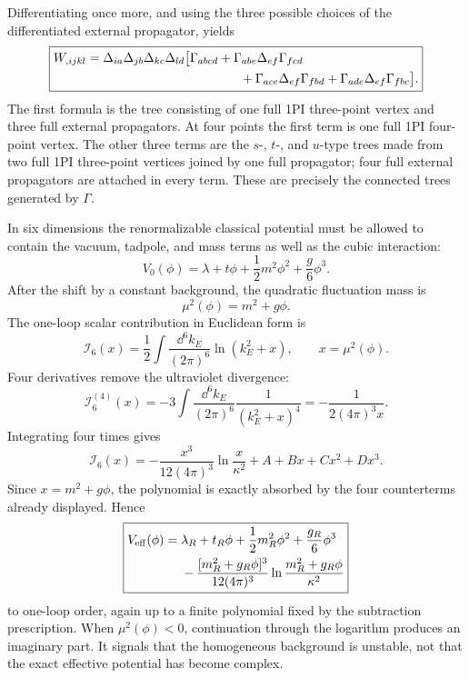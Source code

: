 \begin{enumerate}
  Differentiating once more, and using the three possible choices of the
  differentiated external propagator, yields
  \[
    \boxed{\begin{aligned}
    W_{,ijkl}
      ={}&\Delta_{ia}\Delta_{jb}\Delta_{kc}\Delta_{ld}
      \bigl[
        \Gamma_{abcd}
        +\Gamma_{abe}\Delta_{ef}\Gamma_{fcd}\\
        &\hspace{38mm}
        +\Gamma_{ace}\Delta_{ef}\Gamma_{fbd}
        +\Gamma_{ade}\Delta_{ef}\Gamma_{fbc}
      \bigr].
    \end{aligned}}
  \]
  The first formula is the tree consisting of one full 1PI three-point
  vertex and three full external propagators.  At four points the first
  term is one full 1PI four-point vertex.  The other three terms are the
  \(s\)-, \(t\)-, and \(u\)-type trees made from two full 1PI
  three-point vertices joined by one full propagator; four full external
  propagators are attached in every term.  These are precisely the
  connected trees generated by \(\Gamma\).

  In six dimensions the renormalizable classical potential must be
  allowed to contain the vacuum, tadpole, and mass terms as well as the
  cubic interaction:
  \[
    V_0(\phi)=\lambda+t\phi+\frac12m^2\phi^2+\frac{g}{6}\phi^3 .
  \]
  After the shift by a constant background, the quadratic fluctuation
  mass is
  \[
    \mu^2(\phi)=m^2+g\phi .
  \]
  The one-loop scalar contribution in Euclidean form is
  \[
    \mathcal I_6(x)
      =\frac12\int\frac{\dd^6k_E}{(2\pi)^6}\ln(k_E^2+x),
      \qquad x=\mu^2(\phi).
  \]
  Four derivatives remove the ultraviolet divergence:
  \[
    \mathcal I_6^{(4)}(x)
      =-3\int\frac{\dd^6k_E}{(2\pi)^6}
        \frac1{(k_E^2+x)^4}
      =-\frac{1}{2(4\pi)^3x}.
  \]
  Integrating four times gives
  \[
    \mathcal I_6(x)
      =-\frac{x^3}{12(4\pi)^3}\ln\frac{x}{\kappa^2}
        +A+Bx+Cx^2+Dx^3.
  \]
  Since \(x=m^2+g\phi\), the polynomial is exactly absorbed by the four
  counterterms already displayed.  Hence
  \[
    \boxed{\begin{aligned}
    V_{\rm eff}(\phi)={}&
      \lambda_R+t_R\phi+\frac12m_R^2\phi^2+\frac{g_R}{6}\phi^3\\
      &-\frac{[m_R^2+g_R\phi]^3}{12(4\pi)^3}
        \ln\frac{m_R^2+g_R\phi}{\kappa^2}
    \end{aligned}}
  \]
  to one-loop order, again up to a finite polynomial fixed by the
  subtraction prescription.  When \(\mu^2(\phi)<0\), continuation through
  the logarithm produces an imaginary part.  It signals that the
  homogeneous background is unstable, not that the exact effective
  potential has become complex.


\end{enumerate}
